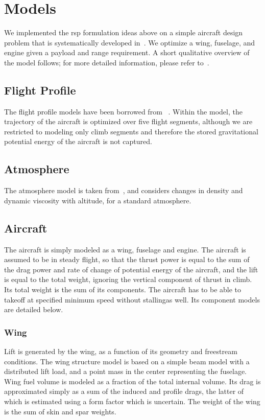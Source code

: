 \section{Models}

We implemented the \gls{rsp} formulation ideas above on a simple aircraft design problem that is systematically developed in~\cite{Ozturk2018}.
We optimize a wing, fuselage, and engine given a payload and range requirement. A short qualitative overview of the model follows; for
more detailed information, please refer to~\cite{Ozturk2018}.

\subsection{Flight Profile}

The flight profile models have been borrowed from ~\cite{York2018}. Within the model, the
trajectory of the aircraft is optimized over five flight segments,
although we are restricted to modeling only climb segments
and therefore the stored gravitational potential energy of the aircraft is not captured.

\subsection{Atmosphere}

The atmosphere model is taken from~\cite{Tao2018}, and considers changes in density and dynamic
viscosity with altitude, for a standard atmosphere.

\subsection{Aircraft}

The aircraft is simply modeled as a wing, fuselage and engine. The aircraft is assumed
to be in steady flight, so that the thrust power is equal to the sum of the drag power and rate of change
of potential energy of the aircraft, and the lift is equal to the total weight, ignoring the vertical component of
thrust in climb. Its total weight is the sum of its components.
The aircraft has to be able to takeoff at specified minimum speed without stallingas well.
Its component models are detailed below.

\subsubsection{Wing}

Lift is generated by the wing, as a function of its geometry and freestream conditions.
The wing structure model is based on a simple beam model with a distributed lift load,
and a point mass in the center representing the fuselage.
Wing fuel volume is modeled as a fraction of the total internal volume. Its drag is
approximated simply as a sum of the induced and profile drags, the latter of which is estimated using a
form factor which is uncertain. The weight of the wing is the sum of skin and spar weights.

